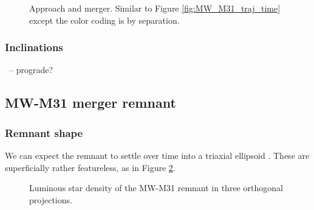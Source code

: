 \documentclass[twocolumn]{aastex63}
\newcommand{\todo}{\color{red}{TODO}\color{black}\hspace{2mm}}
\begin{document}
\begin{figure}[htb!]
	\caption{Approach and merger. Similar to Figure \ref{fig:MW_M31_traj_time} except the color coding is by separation.
		\label{fig:MW_M31_traj_sep}}
\end{figure}


\todo{changes in mass profile}

\subsubsection{Inclinations}

\todo{Relative rotation axes of disks}\ -- prograde?



\subsection{MW-M31 merger remnant}


\subsubsection{Remnant shape}

\todo{boxiness?}

We can expect the remnant to settle over time into a triaxial ellipsoid \todo{ref?}. These are superficially rather featureless, as in Figure \ref{fig:rem_shape}. 

\begin{figure}[htb!]
	\caption{Luminous star density of the MW-M31 remnant in three orthogonal projections.
		\label{fig:rem_shape}}
\end{figure}
\end{document}
